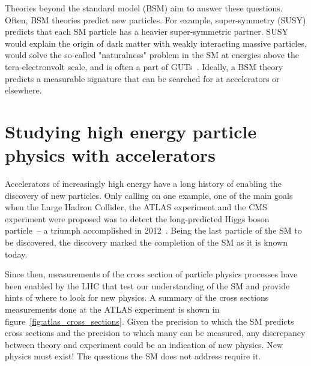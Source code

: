 Theories beyond the standard model (BSM) aim to answer these questions. Often, BSM theories predict new particles. For example, super-symmetry (SUSY) predicts that each SM particle has a heavier super-symmetric partner. SUSY would explain the origin of dark matter with weakly interacting massive particles, would solve the so-called "naturalness" problem in the SM at energies above the tera-electronvolt scale, and is often a part of GUTs~\cite{jungman_supersymmetric_1996}. Ideally, a BSM theory predicts a measurable signature that can be searched for at accelerators or elsewhere.

\section{Studying high energy particle physics with accelerators}

Accelerators of increasingly high energy have a long history of enabling the discovery of new particles. Only calling on one example, one of the main goals when the Large Hadron Collider, the ATLAS experiment and the CMS experiment were proposed was to detect the long-predicted Higgs boson particle~-- a triumph accomplished in 2012~\cite{the_atlas_collaboration_observation_2012, the_cms_collaboration_observation_2012}. Being the last particle of the SM to be discovered, the discovery marked the completion of the SM as it is known today.

Since then, measurements of the cross section of particle physics processes have been enabled by the LHC that test our understanding of the SM and provide hints of where to look for new physics. A summary of the cross sections measurements done at the ATLAS experiment is shown in figure~\ref{fig:atlas_cross_sections}. Given the precision to which the SM predicts cross sections and the precision to which many can be measured, any discrepancy between theory and experiment could be an indication of new physics. New physics must exist! The questions the SM does not address require it.

